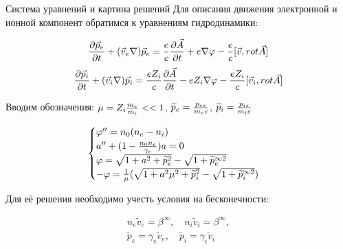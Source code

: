 \begin{frame}[t]{}
\begin{columns}[t]
\begin{column}{.48\linewidth}
\begin{block}{Система уравнений и картина решений}
		 Для описания движения электронной и ионной компонент обратимся к уравнениям гидродинамики:

$$\pdv{\vec p_e}{t}+(\vec v_e \nabla)\vec p_e={{e}\over{c}}\pdv{\vec A}{t}+e\nabla\varphi-{{e}\over{c}}[\vec v,rot\vec A]$$
$$\pdv{\vec p_i}{t}+(\vec v_i \nabla)\vec p_i={{eZ_i}\over{c}}\pdv{\vec A}{t}-eZ_i\nabla\varphi-{{eZ_i}\over{c}}[\vec v_i,rot\vec A]$$
\vspace{1em}

Вводим обозначения: $\mu=Z_i{{m_e}\over{m_i}}<<1$, $\widetilde p_e={{p_{ez}\over{m_ec}}}$, $\widetilde p_i={{p_{iz}\over{m_ic}}}$

\begin{equation}
        	       \begin{cases}
            \varphi''=n_0(n_e-n_i)\\
            a''+(1-{{n_0n_e}\over{\gamma_e}})a=0\\
             \varphi=\sqrt{1+a^2+\widetilde p_e^2}-\sqrt{1+\widetilde p_e^{\infty2}}\\
            -\varphi={{1}\over{\mu}}(\sqrt{1+a^2\mu^2+\widetilde p_i^2}-\sqrt{1+\widetilde p_i^{\infty2}})
            \end{cases}
        \end{equation}

\vspace{1em}
Для её решения необходимо учесть условия на бесконечности:

\begin{gather}
  n_e\widetilde v_e=\beta^\infty, \quad 
  n_i\widetilde v_i=\beta^\infty, \\
  \widetilde p_e=\gamma_e \widetilde v_e, \quad
  \widetilde p_i=\gamma_i \widetilde v_i
\end{gather}
\vspace{0.6em}


\end{block}
\end{column}
\end{columns}
\end{frame}
